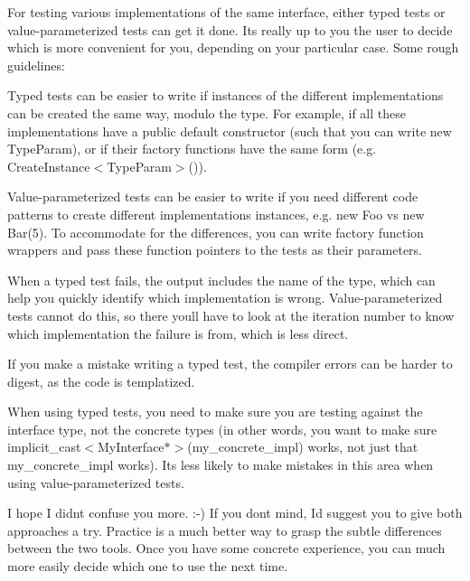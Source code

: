 For testing various implementations of the same interface, either typed tests or value-\/parameterized tests can get it done. It\textquotesingle{}s really up to you the user to decide which is more convenient for you, depending on your particular case. Some rough guidelines\+:


\begin{DoxyItemize}
\item Typed tests can be easier to write if instances of the different implementations can be created the same way, modulo the type. For example, if all these implementations have a public default constructor (such that you can write {\ttfamily new Type\+Param}), or if their factory functions have the same form (e.\+g. {\ttfamily Create\+Instance$<$Type\+Param$>$()}).
\item Value-\/parameterized tests can be easier to write if you need different code patterns to create different implementations\textquotesingle{} instances, e.\+g. {\ttfamily new Foo} vs {\ttfamily new Bar(5)}. To accommodate for the differences, you can write factory function wrappers and pass these function pointers to the tests as their parameters.
\item When a typed test fails, the output includes the name of the type, which can help you quickly identify which implementation is wrong. Value-\/parameterized tests cannot do this, so there you\textquotesingle{}ll have to look at the iteration number to know which implementation the failure is from, which is less direct.
\item If you make a mistake writing a typed test, the compiler errors can be harder to digest, as the code is templatized.
\item When using typed tests, you need to make sure you are testing against the interface type, not the concrete types (in other words, you want to make sure {\ttfamily implicit\+\_\+cast$<$My\+Interface$\ast$$>$(my\+\_\+concrete\+\_\+impl)} works, not just that {\ttfamily my\+\_\+concrete\+\_\+impl} works). It\textquotesingle{}s less likely to make mistakes in this area when using value-\/parameterized tests.
\end{DoxyItemize}

I hope I didn\textquotesingle{}t confuse you more. \+:-\/) If you don\textquotesingle{}t mind, I\textquotesingle{}d suggest you to give both approaches a try. Practice is a much better way to grasp the subtle differences between the two tools. Once you have some concrete experience, you can much more easily decide which one to use the next time.

